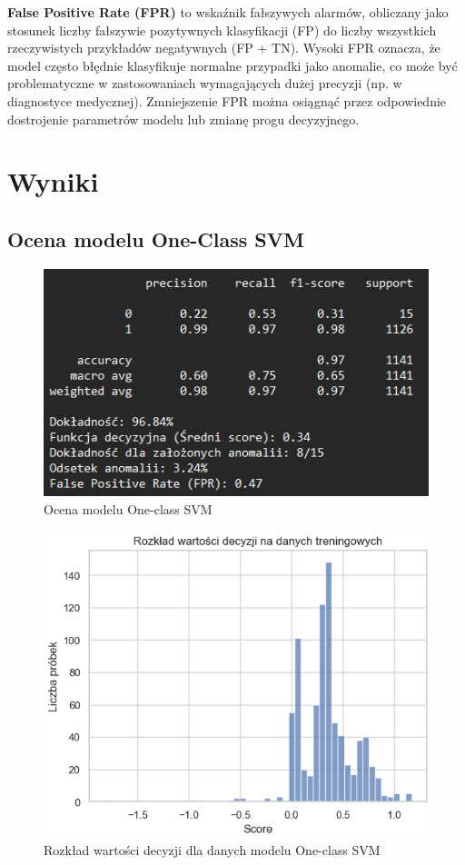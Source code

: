\documentclass[a4paper,fleqn]{cas-dc}
\begin{document}
\textbf{False Positive Rate (FPR)} to wskaźnik fałszywych alarmów, obliczany jako stosunek liczby fałszywie pozytywnych klasyfikacji (FP) do liczby wszystkich rzeczywistych przykładów negatywnych (FP + TN). Wysoki FPR oznacza, że model często błędnie klasyfikuje normalne przypadki jako anomalie, co może być problematyczne w zastosowaniach wymagających dużej precyzji (np. w diagnostyce medycznej). Zmniejszenie FPR można osiągnąć przez odpowiednie dostrojenie parametrów modelu lub zmianę progu decyzyjnego.

\section{Wyniki}

\subsection{Ocena modelu One-Class SVM}

\begin{figure}[h]
	\includegraphics[scale=.70]{wykresy/ocena1.png}
	\caption{Ocena modelu One-class SVM}
	\label{FIG:1}
\end{figure}

\begin{figure}[h]
	\includegraphics[scale=.66]{wykresy/ocena2.png}
	\caption{Rozkład wartości decyzji dla danych modelu One-class SVM}
	\label{FIG:1}
\end{figure}
\end{document}
